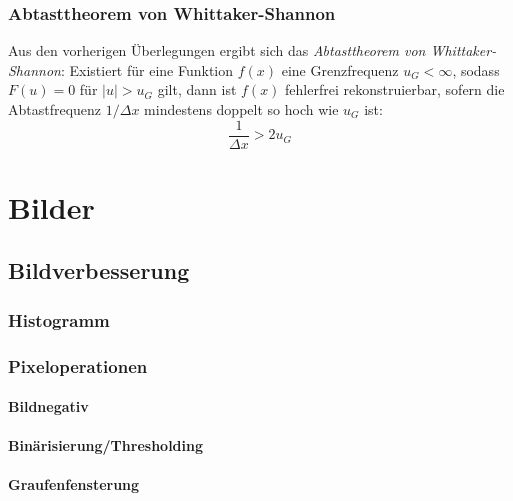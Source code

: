 \documentclass[a4paper, 11pt, accentcolor = tud3b]{tudreport}
\begin{document}
			\subsection{Abtasttheorem von Whittaker-Shannon}
				Aus den vorherigen Überlegungen ergibt sich das \emph{Abtasttheorem von Whittaker-Shannon}: Existiert für eine Funktion \( f(x) \) eine Grenzfrequenz \( u_G < \infty \), sodass \( F(u) = 0 \) für \( \lvert u \rvert > u_G \) gilt, dann ist \( f(x) \) fehlerfrei rekonstruierbar, sofern die Abtastfrequenz \( 1 / \Delta x \) mindestens doppelt so hoch wie \( u_G \) ist:
				\begin{equation*}
					\frac{1}{\Delta x} > 2 u_G
				\end{equation*}

	\chapter{Bilder} %

		\section{Bildverbesserung} %

			\subsection{Histogramm} %

			\subsection{Pixeloperationen} %

				\subsubsection{Bildnegativ} %

				\subsubsection{Binärisierung/Thresholding} %

				\subsubsection{Graufenfensterung} %
\end{document}
